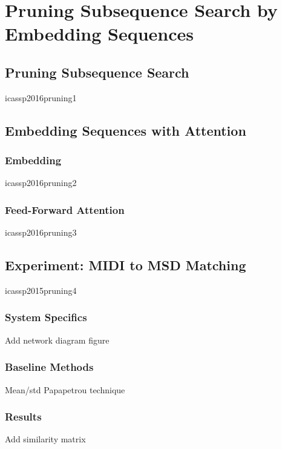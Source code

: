 \chapter{Pruning Subsequence Search by Embedding Sequences}

\section{Pruning Subsequence Search}

icassp2016pruning1

\section{Embedding Sequences with Attention}

\subsection{Embedding}

icassp2016pruning2

\subsection{Feed-Forward Attention}

icassp2016pruning3

\section{Experiment: MIDI to MSD Matching}

icassp2015pruning4

\subsection{System Specifics}

Add network diagram figure

\subsection{Baseline Methods}

Mean/std
Papapetrou technique

\subsection{Results}

Add similarity matrix
